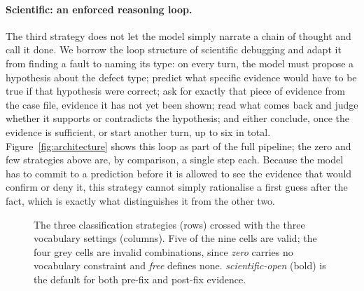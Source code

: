 \paragraph{Scientific: an enforced reasoning loop.}
The third strategy does not let the model simply narrate a chain of thought and
call it done. We borrow the loop structure of scientific debugging and adapt it
from finding a fault to naming its type: on every turn, the model must propose a
hypothesis about the defect type; predict what specific evidence would have to
be true if that hypothesis were correct; ask for exactly that piece of evidence
from the case file, evidence it has not yet been shown; read what comes back and
judge whether it supports or contradicts the hypothesis; and either conclude,
once the evidence is sufficient, or start another turn, up to six in total.
Figure~\ref{fig:architecture} shows this loop as part of the full
pipeline; the zero and few strategies above are, by comparison, a single step
each. Because the model has to commit to a prediction before it is allowed to
see the evidence that would confirm or deny it, this strategy cannot simply
rationalise a first guess after the fact, which is exactly what distinguishes
it from the other two.

\begin{figure}[H]
\centering
{}
\caption{The three classification strategies (rows) crossed with the three
         vocabulary settings (columns). Five of the nine cells are valid; the
         four grey cells are invalid combinations, since \textit{zero} carries
         no vocabulary constraint and \textit{free} defines none.
         \textit{scientific-open} (bold) is the default for both pre-fix and
         post-fix evidence.}
\label{fig:conditions}
\end{figure}


